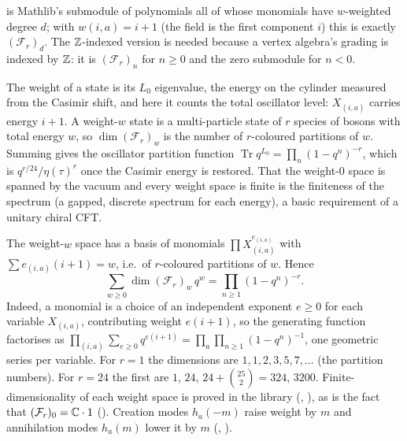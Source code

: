 \begin{dictionary}
 is Mathlib's submodule of polynomials all of whose
monomials have $w$-weighted degree $d$; with $w(i,a)=i+1$ (the field  is the first
component $i$) this is exactly $(\mathcal F_r)_d$. The ${\mathbb{Z}}$-indexed version  is
needed because a vertex algebra's grading is indexed by ${\mathbb{Z}}$: it is $(\mathcal F_r)_n$ for $n\ge0$
and the zero submodule  for $n<0$.
\end{dictionary}

\begin{physics}
The weight of a state is its $L_0$ eigenvalue, the energy on the cylinder measured from the Casimir shift, and here it counts the total oscillator level: $X_{(i,a)}$ carries energy $i+1$. A weight-$w$ state is a multi-particle state of $r$ species of bosons with total energy $w$, so $\dim(\mathcal F_r)_w$ is the number of $r$-coloured partitions of $w$. Summing gives the oscillator partition function $\operatorname{Tr}q^{L_0}=\prod_n(1-q^n)^{-r}$, which is $q^{r/24}/\eta(\tau)^{r}$ once the Casimir energy is restored. That the weight-$0$ space is spanned by the vacuum and every weight space is finite is the finiteness of the spectrum (a gapped, discrete spectrum for each energy), a basic requirement of a unitary chiral CFT.
\end{physics}

The weight-$w$ space has a basis of monomials $\prod X_{(i,a)}^{e_{(i,a)}}$ with
$\sum e_{(i,a)}(i+1)=w$, i.e.\ of $r$-coloured partitions of $w$. Hence
\begin{equation}\label{ch03:eq:fockchar}
  \sum_{w\ge0}\dim(\mathcal F_r)_w\,q^w=\prod_{n\ge1}(1-q^n)^{-r}.
\end{equation}
Indeed, a monomial is a choice of an independent exponent $e\ge0$ for each variable $X_{(i,a)}$,
contributing weight $e(i+1)$, so the generating function factorises as
$\prod_{(i,a)}\sum_{e\ge0}q^{e(i+1)}=\prod_{a}\prod_{n\ge1}(1-q^n)^{-1}$, one geometric series per
variable.
For $r=1$ the dimensions are $1,1,2,3,5,7,\dots$ (the partition numbers). For $r=24$ the first are
$1$, $24$, $24+\binom{25}{2}=324$, $3200$. Finite-dimensionality of each weight space is proved in
the library (, ), as is the fact that
$(\mathcal F_r)_0={\mathbb{C}}\cdot 1$ (). Creation modes $h_a(-m)$ raise
weight by $m$ and annihilation modes $h_a(m)$ lower it by $m$ (,
).

